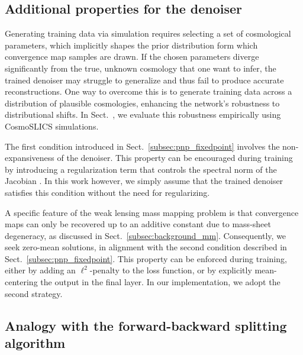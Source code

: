 \documentclass{aa}
\begin{document}
\subsection{Additional properties for the denoiser}
\label{subsec:pnp_denoiserprops}

Generating training data via simulation requires selecting a set of cosmological parameters, which implicitly shapes the prior distribution form which convergence map samples are drawn. If the chosen parameters diverge significantly from the true, unknown cosmology that one want to infer, the trained denoiser may struggle to generalize and thus fail to produce accurate reconstructions. One way to overcome this is to generate training data across a distribution of plausible cosmologies, enhancing the network's robustness to distributional shifts. In Sect.~\todo, we evaluate this robustness empirically using CosmoSLICS simulations.

The first condition introduced in Sect.~\ref{subsec:pnp_fixedpoint} involves the non-expansiveness of the denoiser. This property can be encouraged during training by introducing a regularization term that controls the spectral norm of the Jacobian \citep{Pesquet2021}. In this work however, we simply assume that the trained denoiser satisfies this condition without the need for regularizing.

A specific feature of the weak lensing mass mapping problem is that convergence maps can only be recovered up to an additive constant due to mass-sheet degeneracy, as discussed in Sect.~\ref{subsec:background_mm}. Consequently, we seek zero-mean solutions, in alignment with the second condition described in Sect.~\ref{subsec:pnp_fixedpoint}. This property can be enforced during training, either by adding an $\ell^2$-penalty to the loss function, or by explicitly mean-centering the output in the final layer. In our implementation, we adopt the second strategy.

\subsection{Analogy with the forward-backward splitting algorithm}
\label{subsec:pnp_fb}
\end{document}
